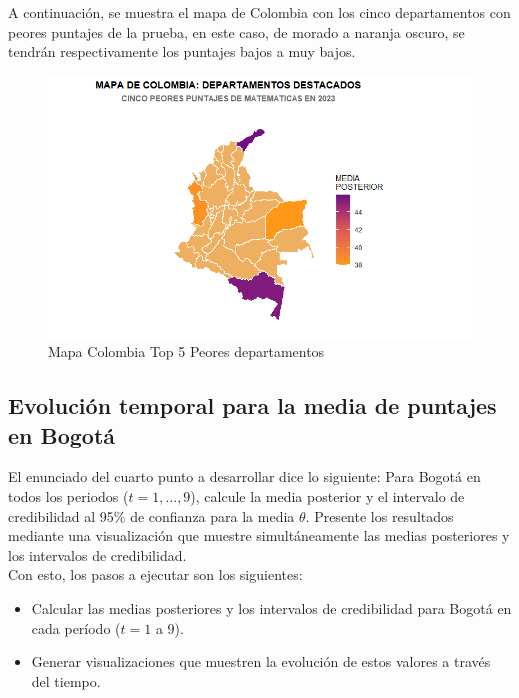 \documentclass[12pt]{article}
\begin{document}
A continuación, se muestra el mapa de Colombia con los cinco departamentos con peores puntajes de la prueba, en este caso, de morado a naranja oscuro, se tendrán respectivamente los puntajes bajos a muy  bajos.

\begin{figure}[H]
    \centering
    \includegraphics[width=1\linewidth]{Imagenes/MapaColombia3.png}
    \caption{Mapa Colombia Top 5 Peores departamentos}
    \label{fig_enter_label}
\end{figure}


\subsection{Evolución temporal para la media de puntajes en Bogotá}

El enunciado del cuarto punto a desarrollar dice lo siguiente: Para Bogotá en todos los periodos ($t=1,\ldots,9$), calcule la media posterior y el intervalo de credibilidad al 95$\%$ de confianza para la media $\theta$. Presente los resultados mediante una visualización que muestre simultáneamente las medias posteriores y los intervalos de credibilidad.\\

Con esto, los pasos a ejecutar son los siguientes:

\begin{itemize}
    \item Calcular las medias posteriores y los intervalos de credibilidad para Bogotá en cada período ($t = 1$ a $9$).
    \item Generar visualizaciones que muestren la evolución de estos valores a través del tiempo.
\end{itemize}
\end{document}
